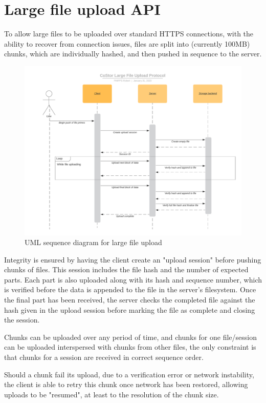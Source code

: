 \documentclass[bsc,frontabs,twoside,singlespacing,parskip,deptreport]{infthesis}     %
\begin{document}
\section{Large file upload API}

To allow large files to be uploaded over standard HTTPS connections, with the ability to recover
from connection issues, files are split into (currently 100MB) chunks, which are individually
hashed, and then pushed in sequence to the server.

\begin{figure}[h]
	\includegraphics[width=\linewidth]{img/lfileupload.png}
	\caption{UML sequence diagram for large file upload}
	\label{fig:lfileupload}
\end{figure}

Integrity is ensured by having the client create an "upload session" before pushing chunks of
files. This session includes the file hash and the number of expected parts. Each part is also 
uploaded along with its hash and sequence number, which is verified before the data is appended 
to the file in the server's filesystem. Once the final part has been received, the server 
checks the completed file against the hash given in the upload session before marking the file
as complete and closing the session.

Chunks can be uploaded over any period of time, and chunks for one file/session can be uploaded
interspersed with chunks from other files, the only constraint is that chunks for a session are
received in correct sequence order.

Should a chunk fail its upload, due to a verification error or network instability, the client
is able to retry this chunk once network has been restored, allowing uploads to be "resumed", at 
least to the resolution of the chunk size.
\end{document}

